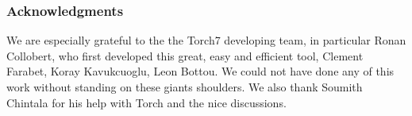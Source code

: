 \documentclass{article} %
\begin{document}
%


\subsubsection*{Acknowledgments}
We are especially grateful to the the Torch7 developing team, in particular Ronan Collobert, who first developed this great, easy and efficient tool, Clement Farabet, Koray Kavukcuoglu, Leon Bottou. We could not have done any of this work without standing on these giants shoulders. We also thank Soumith Chintala for his help with Torch and the nice discussions.



\end{document}

